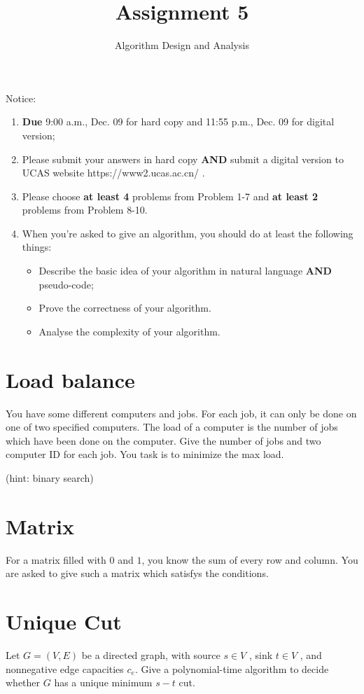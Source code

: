 \documentclass[a4paper,11pt]{article}
\title{Assignment 5}
\author{Algorithm Design and Analysis}
\begin{document}
\maketitle

Notice:\\
\begin{enumerate} 
\item {\bf Due} 9:00 a.m., Dec. 09 for hard copy and 11:55 p.m., Dec. 09 for  digital version;
\item Please submit your answers in hard copy {\bf AND} submit a digital version to UCAS website https://www2.ucas.ac.cn/ .
\item Please choose \textbf{at least 4} problems from Problem 1-7 and \textbf{at least 2} problems from Problem 8-10.
\item When you're asked to give an algorithm, you should do at least the following things:
\begin{itemize} 
\item 
Describe the basic idea of your algorithm in natural language {\bf AND} pseudo-code;
\item 
Prove the correctness of your algorithm.
\item Analyse the complexity of your algorithm.
\end{itemize} 
\end{enumerate}


\section{Load balance}
\noindent
You have some different computers and jobs. For each job, it can only be done on one of two specified computers.
The load of a computer is the number of jobs which have been done on the computer. Give the number of jobs and two computer ID for each job. You task is to minimize the max load.

(hint: binary search)
\section{Matrix}
\noindent
For a matrix filled with $0$ and $1$, you know the sum of every row and column. You are asked to give such a matrix which satisfys the conditions.

\section{Unique Cut}
\noindent
Let $G = (V, E)$ be a directed graph, with source $s \in V$ , sink $t \in V$ , and nonnegative edge capacities $c_e$. Give a polynomial-time algorithm to decide whether $G$ has a unique minimum $s − t$ cut.
\end{document}
